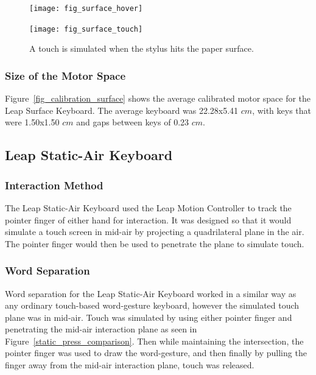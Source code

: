\begin{figure}[h]
	\centering
	\begin{minipage}[t]{5.8in}
		\begin{minipage}[t]{2.85in}
			\texttt{[image: fig\_surface\_hover]}
		\end{minipage}
		\begin{minipage}[t]{2.9in}
			\texttt{[image: fig\_surface\_touch]}
		\end{minipage}
	\end{minipage}
	\caption[Leap Surface Word Separation]{A touch is simulated when the stylus hits the paper surface.}
	\label{leap_surface_press_comparison}
\end{figure}

\subsubsection{Size of the Motor Space}
Figure~\ref{fig_calibration_surface} shows the average calibrated motor space for the Leap Surface Keyboard. The average keyboard was 22.28x5.41 $cm$, with keys that were 1.50x1.50 $cm$ and gaps between keys of 0.23 $cm$.

\subsection{Leap Static-Air Keyboard} \label{static_air}
\subsubsection{Interaction Method}
The Leap Static-Air Keyboard used the Leap Motion Controller to track the pointer finger of either hand for interaction. It was designed so that it would simulate a touch screen in mid-air by projecting a quadrilateral plane in the air. The pointer finger would then be used to penetrate the plane to simulate touch.

\subsubsection{Word Separation}
Word separation for the Leap Static-Air Keyboard worked in a similar way as any ordinary touch-based word-gesture keyboard, however the simulated touch plane was in mid-air. Touch was simulated by using either pointer finger and penetrating the mid-air interaction plane as seen in Figure~\ref{static_press_comparison}. Then while maintaining the intersection, the pointer finger was used to draw the word-gesture, and then finally by pulling the finger away from the mid-air interaction plane, touch was released.

